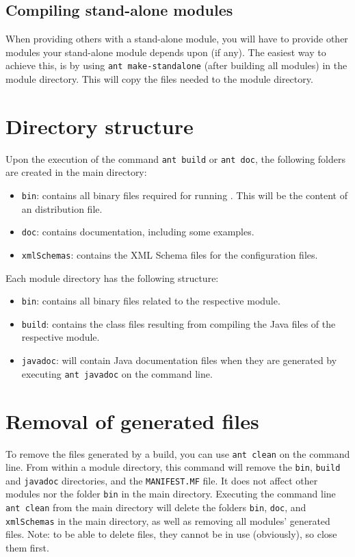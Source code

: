 \subsection{Compiling stand-alone modules}
When providing others with a stand-alone module, you will have to provide other modules your stand-alone module depends upon (if any). The easiest way to achieve this, is by using \verb|ant make-standalone| (after building all \oda modules) in the module directory. This will copy the files needed to the module directory.

\section{Directory structure}
Upon the execution of the command \verb|ant build| or \verb|ant doc|, the following folders are created in the main directory:

\begin{itemize}
\item \verb|bin|: contains all binary files required for running \oda. This will be the content of an \oda distribution file.
\item \verb|doc|: contains \oda documentation, including some examples.
\item \verb|xmlSchemas|: contains the XML Schema files for the \oda configuration files.
\end{itemize}

Each module directory has the following structure:

\begin{itemize}
\item \verb|bin|: contains all binary files related to the respective module.
\item \verb|build|: contains the class files resulting from compiling the Java files of the respective module.
\item \verb|javadoc|: will contain Java documentation files when they are generated by executing \verb|ant javadoc| on the command line.
\end{itemize}

\section{Removal of generated files}
To remove the files generated by a build, you can use \verb|ant clean| on the command line. From within a module directory, this command will remove the \verb|bin|, \verb|build| and \verb|javadoc| directories, and the \verb|MANIFEST.MF| file. It does not affect other modules nor the folder \verb|bin| in the \oda main directory. Executing the command line \verb|ant clean| from the \oda main directory will delete the folders \verb|bin|, \verb|doc|, and \verb|xmlSchemas| in the main directory, as well as removing all modules' generated files. Note: to be able to delete files, they cannot be in use (obviously), so close them first.

